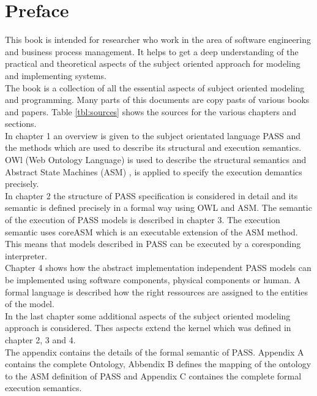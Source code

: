 \documentclass[11pt, showtrims, final, oldfontcommands]{memoir}
\begin{document}
\chapter{Preface}
This book is intended for researcher who work in the area of software engineering and business process management. It helps to get a deep understanding of the practical and theoretical aspects of the subject oriented approach for modeling and implementing systems.\\
The book is a collection of all the essential aspects of subject oriented modeling and programming. Many parts of this documents are copy pasts of various books and papers. Table \ref{tbl:sources} shows the sources for the various chapters and sections.\\
In chapter 1 an overview is given to the subject orientated language PASS and the methods which are used to describe its structural and execution semantics. OWl (Web Ontology Language) \cite{Web:OWL} is used to describe the structural semantics and Abstract State Machines (ASM) \cite{book:ASM-2018}, \cite{book:ASM-2003} is applied to specify the execution demantics precisely.\\
In chapter 2 the structure of PASS specification is considered in detail and its semantic is defined precisely in a formal way using OWL and ASM. The semantic of the execution of PASS models is described in chapter 3. The execution semantic uses coreASM which is an executable extension of the ASM method. This means that models described in PASS can be executed by a coresponding interpreter.\\
Chapter 4 shows how the abstract implementation independent PASS models can be implemented using software components, physical components or human.  A formal language is described how the right ressources are assigned to the entities of the model.\\
In the last chapter some additional aspects of the subject oriented modeling approach is considered. Thes aspects extend the kernel which was defined in chapter 2, 3 and 4.\\
The appendix contains the details of the formal semantic of PASS. Appendix A contains the complete Ontology, Abbendix B defines the mapping of the ontology to the ASM definition of PASS and Appendix C containes the complete formal execution semantics.







\cleardoublepage
\end{document}

